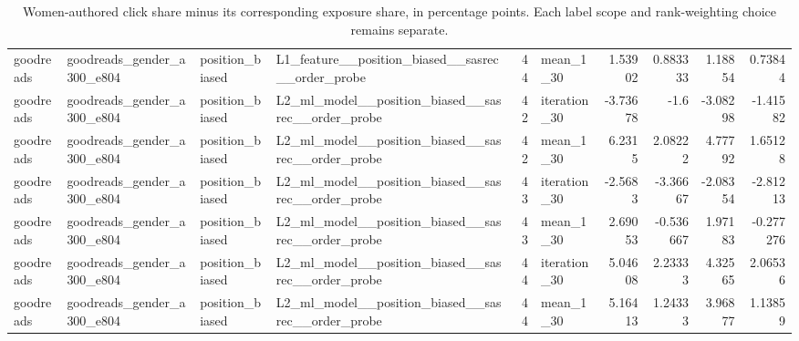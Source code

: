 \begin{table}[htbp!]
\begin{tabular}{llllrlrrrr}
goodreads & goodreads\_gender\_a300\_e804 & position\_biased & L1\_feature\_\_position\_biased\_\_sasrec\_\_order\_probe & 44 & mean\_1\_30 & 1.53902 & 0.883333 & 1.18854 & 0.73844 \\
goodreads & goodreads\_gender\_a300\_e804 & position\_biased & L2\_ml\_model\_\_position\_biased\_\_sasrec\_\_order\_probe & 42 & iteration\_30 & -3.73678 & -1.6 & -3.08298 & -1.41582 \\
goodreads & goodreads\_gender\_a300\_e804 & position\_biased & L2\_ml\_model\_\_position\_biased\_\_sasrec\_\_order\_probe & 42 & mean\_1\_30 & 6.2315 & 2.08222 & 4.77792 & 1.65128 \\
goodreads & goodreads\_gender\_a300\_e804 & position\_biased & L2\_ml\_model\_\_position\_biased\_\_sasrec\_\_order\_probe & 43 & iteration\_30 & -2.5683 & -3.36667 & -2.08354 & -2.81213 \\
goodreads & goodreads\_gender\_a300\_e804 & position\_biased & L2\_ml\_model\_\_position\_biased\_\_sasrec\_\_order\_probe & 43 & mean\_1\_30 & 2.69053 & -0.536667 & 1.97183 & -0.277276 \\
goodreads & goodreads\_gender\_a300\_e804 & position\_biased & L2\_ml\_model\_\_position\_biased\_\_sasrec\_\_order\_probe & 44 & iteration\_30 & 5.04608 & 2.23333 & 4.32565 & 2.06536 \\
goodreads & goodreads\_gender\_a300\_e804 & position\_biased & L2\_ml\_model\_\_position\_biased\_\_sasrec\_\_order\_probe & 44 & mean\_1\_30 & 5.16413 & 1.24333 & 3.96877 & 1.13859 \\
\hline
\end{tabular}
\caption{Women-authored click share minus its corresponding exposure share, in percentage points. Each label scope and rank-weighting choice remains separate.}
\label{chap:results:tab:rq7_gender_click_exposure_gap_summaries}
\end{table}
